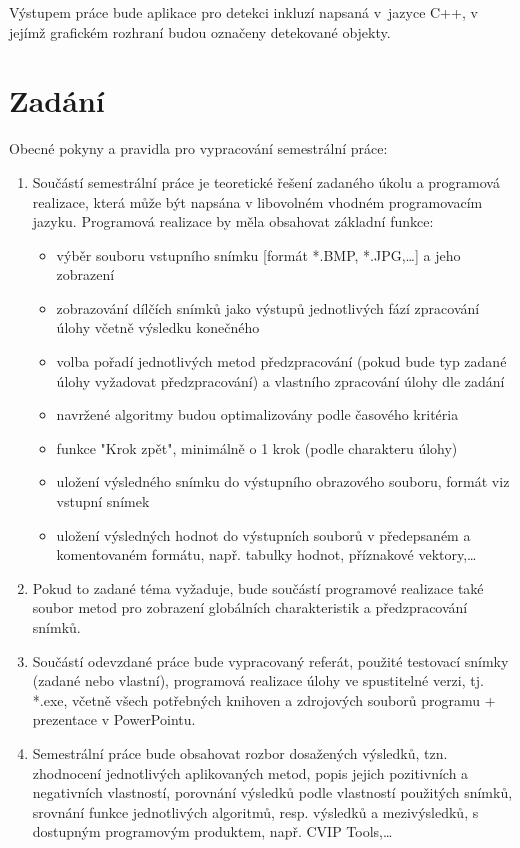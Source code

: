 \documentclass[12pt, a4paper]{report}
\begin{document}
Výstupem práce bude aplikace pro detekci inkluzí napsaná v~jazyce C++, v jejímž grafickém rozhraní budou označeny detekované objekty.

\chapter{Zadání}
Obecné pokyny a pravidla pro vypracování semestrální práce:
\begin{enumerate}
	\item Součástí semestrální práce je teoretické řešení zadaného úkolu a programová realizace, která může být napsána v libovolném vhodném programovacím jazyku. Programová realizace by měla obsahovat základní funkce:
	\begin{itemize}
		\item{výběr souboru vstupního snímku [formát *.BMP, *.JPG,…] a jeho zobrazení}
		\item{zobrazování dílčích snímků jako výstupů jednotlivých fází zpracování úlohy včetně výsledku konečného}
		\item{volba pořadí jednotlivých metod předzpracování (pokud bude typ zadané úlohy vyžadovat
předzpracování) a vlastního zpracování úlohy dle zadání}
		\item{navržené algoritmy budou optimalizovány podle časového kritéria}
		\item{funkce "Krok zpět", minimálně o 1 krok (podle charakteru úlohy)}
		\item{uložení výsledného snímku do výstupního obrazového souboru, formát viz vstupní snímek}
		\item{uložení výsledných hodnot do výstupních souborů v předepsaném a komentovaném formátu,
např. tabulky hodnot, příznakové vektory,…}
	\end{itemize}
\item{Pokud to zadané téma vyžaduje, bude součástí programové realizace také soubor metod pro
zobrazení globálních charakteristik a předzpracování snímků.}		
\item{Součástí odevzdané práce bude vypracovaný referát, použité testovací snímky (zadané nebo
vlastní), programová realizace úlohy ve spustitelné verzi, tj. *.exe, včetně všech potřebných
knihoven a zdrojových souborů programu + prezentace v PowerPointu.}
\item{Semestrální práce bude obsahovat rozbor dosažených výsledků, tzn. zhodnocení jednotlivých
aplikovaných metod, popis jejich pozitivních a negativních vlastností, porovnání výsledků podle
vlastností použitých snímků, srovnání funkce jednotlivých algoritmů, resp. výsledků
a mezivýsledků, s dostupným programovým produktem, např. CVIP Tools,…}
\end{enumerate}
\end{document}
